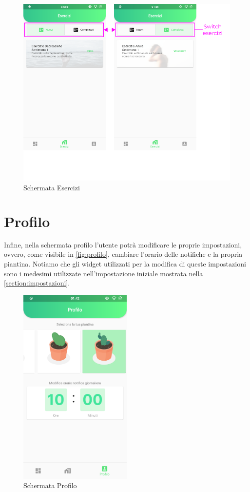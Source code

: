\begin{figure}[h!]
\centering
\includegraphics[width=\textwidth]{img/schermata_esercizi}
\caption{Schermata Esercizi}
\label{fig:schermata_esercizi}
\end{figure}

\newpage
\section{Profilo}
Infine, nella schermata profilo l'utente potrà modificare le proprie impostazioni, ovvero, come visibile in \autoref{fig:profilo}, cambiare l'orario delle notifiche e la propria piantina. Notiamo che gli widget utilizzati per la modifica di queste impostazioni sono i medesimi utilizzate nell'impostazione iniziale mostrata nella \autoref{section:impostazioni}.

\begin{figure}[h!]
\centering
\includegraphics[width=0.5\textwidth]{img/profilo}
\caption{Schermata Profilo}
\label{fig:profilo}
\end{figure}